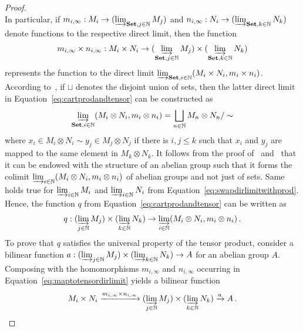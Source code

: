 \documentclass[12pt, a4paper]{article}
\numberwithin{equation}{section}
\theoremstyle{empty}
\theoremstyle{nonumberplain}
\newtheorem{proof}{Proof}
\begin{document}
\begin{proof}
\begin{equation}
\end{equation}
In particular, if $m_{i, \infty}: M_i \rightarrow (\varinjlim_{\mathbf{Set}, j \in \mathbb{N}} M_j)$ and $n_{i, \infty}: N_i \rightarrow (\varinjlim_{\mathbf{Set}, k \in \mathbb{N}} N_k)$ denote functions to the respective direct limit, then the function
\begin{equation}\label{eq:maptotensordirlimit}
m_{i, \infty} \times n_{i, \infty}: M_i \times N_i \rightarrow (\varinjlim_{\mathbf{Set}, j \in \mathbb{N}} M_j) \times (\varinjlim_{\mathbf{Set}, k \in \mathbb{N}} N_k)
\end{equation}
represents the function to the direct limit $\varinjlim_{\mathbf{Set}, i \in \mathbb{N}} (M_i \times N_i, m_i \times n_i)$. According to~\cite[\href{https://stacks.math.columbia.edu/tag/04AX}{Tag 04AX}]{stacks-project}, if $\sqcup$ denotes the disjoint union of sets, then the latter direct limit in Equation~\ref{eq:cartprodandtensor} can be constructed as
\begin{equation}\label{eq:dirlimitofsets}
\varinjlim_{\mathbf{Set}, i \in \mathbb{N}} (M_i \otimes N_i, m_i \otimes n_i) = \bigsqcup_{n \in \mathbb{N}} M_n \otimes N_n / \sim
\end{equation}
where $x_i \in M_i \otimes N_i \sim  y_j \in M_j \otimes N_j$ if there is $i, j \leq k$ such that $x_i$ and $y_j$ are mapped to the same element in $M_k \otimes N_k$. It follows from the proof of~\cite[Proposition~1.2.1]{rib10} and~\cite[\href{https://stacks.math.columbia.edu/tag/09WR}{Tag 09WR}]{stacks-project} that it can be endowed with the structure of an abelian group such that it forms the colimit $\varinjlim_{i \in \mathbb{N}} (M_i \otimes N_i, m_i \otimes n_i)$ of abelian groups and not just of sets. Same holds true for $\varinjlim_{i \in \mathbb{N}} M_i$ and $\varinjlim_{i \in \mathbb{N}} N_i$ from Equation~\ref{eq:swapdirlimitwithprod}. Hence, the function $q$ from Equation~\ref{eq:cartprodandtensor} can be written as
\[ q: (\varinjlim_{j \in \mathbb{N}} M_j) \times (\varinjlim_{k \in \mathbb{N}} N_k) \rightarrow \varinjlim_{i \in \mathbb{N}} (M_i \otimes N_i, m_i \otimes n_i) \, . \]
To prove that $q$ satisfies the universal property of the tensor product, consider a bilinear function $a: (\varinjlim_{j \in \mathbb{N}} M_j) \times (\varinjlim_{k \in \mathbb{N}} N_k) \rightarrow A$ for an abelian group $A$. Composing with the homomorphisms $m_{i, \infty}$ and $n_{i, \infty}$ occurring in Equation~\ref{eq:maptotensordirlimit} yields a bilinear function
\[ M_i \times N_i \xrightarrow{m_{i, \infty} \times n_{i, \infty}} (\varinjlim_{j \in \mathbb{N}} M_j) \times (\varinjlim_{k \in \mathbb{N}} N_k) \xrightarrow{a} A \, . \]

\end{proof}
\end{document}
